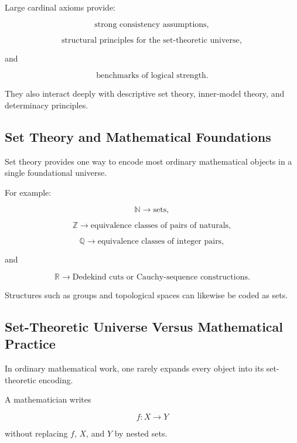 Large cardinal axioms provide:

\[
\boxed{
\text{strong consistency assumptions},
}
\]

\[
\boxed{
\text{structural principles for the set-theoretic universe},
}
\]

and

\[
\boxed{
\text{benchmarks of logical strength}.
}
\]

They also interact deeply with descriptive set theory, inner-model theory,
and determinacy principles.

\subsection{Set Theory and Mathematical Foundations}
\label{subsec:set-theory-foundations}

Set theory provides one way to encode most ordinary mathematical objects in
a single foundational universe.

For example:

\[
\boxed{
\mathbb{N}
\rightarrow
\text{sets},
}
\]

\[
\boxed{
\mathbb{Z}
\rightarrow
\text{equivalence classes of pairs of naturals},
}
\]

\[
\boxed{
\mathbb{Q}
\rightarrow
\text{equivalence classes of integer pairs},
}
\]

and

\[
\boxed{
\mathbb{R}
\rightarrow
\text{Dedekind cuts or Cauchy-sequence constructions}.
}
\]

Structures such as groups and topological spaces can likewise be coded as
sets.

\subsection{Set-Theoretic Universe Versus Mathematical Practice}
\label{subsec:set-universe-vs-practice}

In ordinary mathematical work, one rarely expands every object into its
set-theoretic encoding.

A mathematician writes

\[
f:X\to Y
\]

without replacing \(f\), \(X\), and \(Y\) by nested sets.

